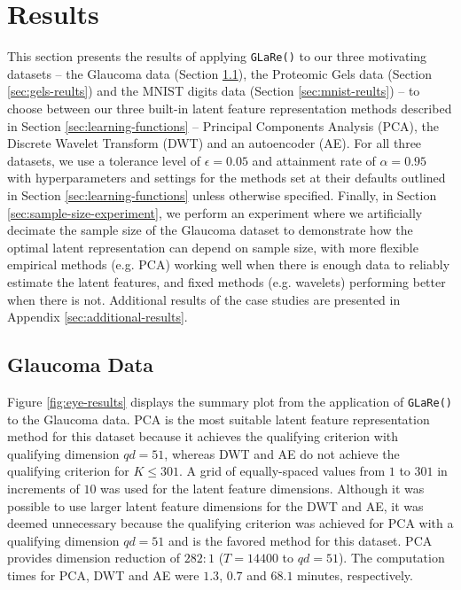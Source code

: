 \section{Results}\label{sec:results}

This section presents the results of applying \texttt{GLaRe()} to our three motivating datasets --  the Glaucoma data (Section \ref{sec:glaucoma-reults}), the Proteomic Gels data (Section \ref{sec:gels-reults}) and the MNIST digits data (Section \ref{sec:mnist-reults}) -- to choose between our three built-in latent feature representation methods described in Section \ref{sec:learning-functions} -- Principal Components Analysis (PCA), the Discrete Wavelet Transform (DWT) and an autoencoder (AE).
For all three datasets, we use a tolerance level of $\epsilon = 0.05$ and attainment rate of $\alpha=0.95$ with hyperparameters and settings for the methods set at their defaults outlined in Section \ref{sec:learning-functions} unless otherwise specified.
Finally, in Section \ref{sec:sample-size-experiment}, we perform an experiment where we artificially decimate the sample size of the Glaucoma dataset to demonstrate how the optimal latent representation can depend on sample size, with more flexible empirical methods (e.g. PCA) working well when there is enough data to reliably estimate the latent features, and fixed methods (e.g. wavelets) performing better when there is not.
Additional results of the case studies are presented in Appendix \ref{sec:additional-results}.

\subsection{Glaucoma Data}\label{sec:glaucoma-reults}

Figure \ref{fig:eye-results} displays the summary plot from the application of \texttt{GLaRe()} to the Glaucoma data.
PCA is the most suitable latent feature representation method for this dataset because it achieves the qualifying criterion with qualifying dimension $qd=51$, whereas DWT and AE do not achieve the qualifying criterion for $K \leq 301$.
A grid of equally-spaced values from $1$ to $301$ in increments of $10$ was used for the latent feature dimensions.
Although it was possible to use larger latent feature dimensions for the DWT and AE, it was deemed unnecessary because the qualifying criterion was achieved for PCA with a qualifying dimension $qd=51$ and is the favored method for this dataset.
PCA provides dimension reduction of $282:1$ ($T = 14400$ to $qd = 51$).
The computation times for PCA, DWT and AE were $1.3$, $0.7$ and $68.1$ minutes, respectively.


